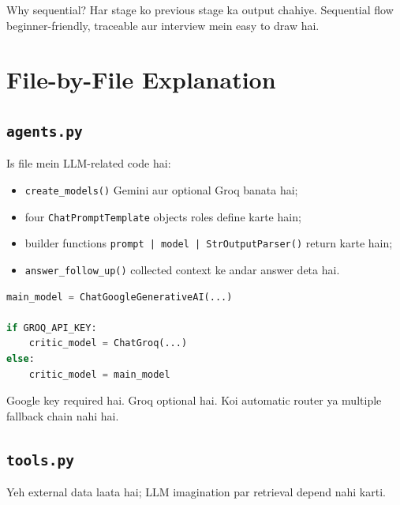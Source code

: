 \documentclass[11pt,a4paper]{article}
\newcommand{\code}[1]{\texttt{#1}}
\begin{document}
Why sequential? Har stage ko previous stage ka output chahiye. Sequential flow beginner-friendly, traceable aur interview mein easy to draw hai.

\section{File-by-File Explanation}

\subsection{\texorpdfstring{\texttt{agents.py}}{agents.py}}

Is file mein LLM-related code hai:

\begin{itemize}
  \item \code{create\_models()} Gemini aur optional Groq banata hai;
  \item four \code{ChatPromptTemplate} objects roles define karte hain;
  \item builder functions \code{prompt | model | StrOutputParser()} return karte hain;
  \item \code{answer\_follow\_up()} collected context ke andar answer deta hai.
\end{itemize}

\begin{lstlisting}[language=Python,caption={Simple model rule}]
main_model = ChatGoogleGenerativeAI(...)

if GROQ_API_KEY:
    critic_model = ChatGroq(...)
else:
    critic_model = main_model
\end{lstlisting}

Google key required hai. Groq optional hai. Koi automatic router ya multiple fallback chain nahi hai.

\subsection{\texorpdfstring{\texttt{tools.py}}{tools.py}}

Yeh external data laata hai; LLM imagination par retrieval depend nahi karti.
\end{document}
